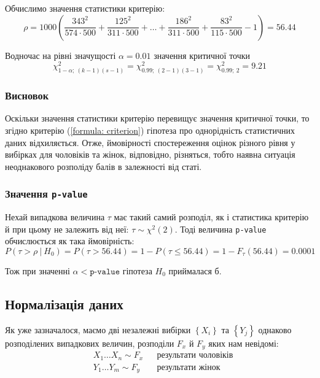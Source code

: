 Обчислимо значення статистики критерію:
\begin{equation*}
    \rho = 1000\left( \frac{343^2}{574\cdot 500}+\frac{125^2}{311\cdot 500} + \ldots + 
    \frac{186^2}{311\cdot 500}+\frac{83^2}{115\cdot 500} - 1 \right) = 56.44
\end{equation*}

Водночас на рівні значущості $\alpha=0.01$ значення критичної точки
\begin{equation*} 
    \chi^2_{1-\alpha;\ (k-1)(s-1)}=\chi^2_{0.99;\ (2-1)(3-1)}=\chi^2_{0.99;\ 2}=9.21
\end{equation*}

\subsubsection{Висновок}

Оскільки значення статистики критерію перевищує значення критичної точки, то згідно критерію 
(\ref{formula: criterion}) гіпотеза про однорідність статистичних даних відхиляється. 
Отже, ймовірності спостереження оцінок різного рівня у вибірках для чоловіків та жінок, 
відповідно, різняться, тобто наявна ситуація неоднакового розполіду балів в залежності від статі.

\subsubsection*{Значення \texttt{p-value}}

Нехай випадкова величина $\tau$ має такий самий розподіл, як і статистика критерію й при цьому не залежить 
від неї: $\tau\sim\chi^2(2)$. Тоді величина \texttt{p-value} обчислюється як така ймовірність:
\[ P(\tau>\rho\ |\ H_0) = P(\tau>56.44) = 1-P(\tau\leqslant56.44) = 1-F_{\tau}(56.44) = 0.0001 \]

Тож при значенні $\alpha < \texttt{p-value}$ гіпотеза $H_0$ приймалася б.

\subsection{Нормалізація даних}

Як уже зазначалося, маємо дві незалежні вибірки $\left\{ X_i \right\}$ та $\left\{ Y_j \right\}$ 
однаково розподілених випадкових величин, розподіли $F_x$ й $F_y$ яких нам невідомі:
\begin{align*}
    &X_1 \ldots X_n\sim F_x && \text{результати чоловіків} \\
    &Y_1 \ldots Y_m\sim F_y && \text{результати жінок}
\end{align*}

